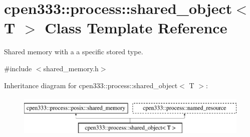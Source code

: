 \hypertarget{classcpen333_1_1process_1_1shared__object}{}\section{cpen333\+:\+:process\+:\+:shared\+\_\+object$<$ T $>$ Class Template Reference}
\label{classcpen333_1_1process_1_1shared__object}


Shared memory with a a specific stored type.  




{\ttfamily \#include $<$shared\+\_\+memory.\+h$>$}

Inheritance diagram for cpen333\+:\+:process\+:\+:shared\+\_\+object$<$ T $>$\+:\begin{figure}[H]
\begin{center}
\leavevmode
\includegraphics[height=2.000000cm]{classcpen333_1_1process_1_1shared__object}
\end{center}
\end{figure}
